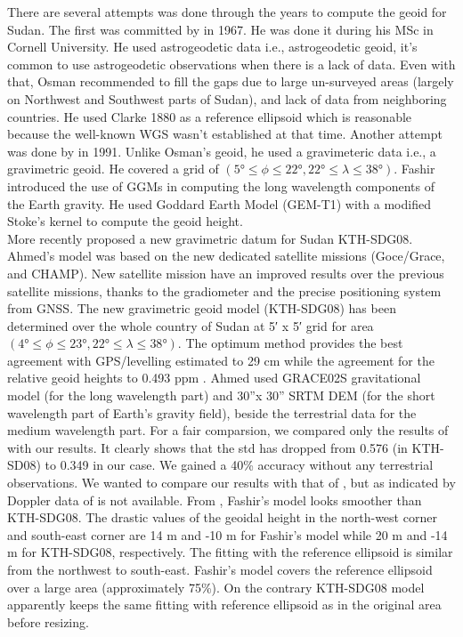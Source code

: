 There are several attempts was done through the years to compute the geoid for Sudan. The first was committed by \cite{osman} in 1967. He was done it during his MSc in Cornell University. He used astrogeodetic data i.e., astrogeodetic geoid, it's common to use astrogeodetic observations when there is a lack of data. Even with that, Osman recommended to fill the gaps due to large un-surveyed areas (largely on Northwest and Southwest parts of Sudan), and lack of data from neighboring countries. He used Clarke 1880 as a reference ellipsoid which is reasonable because the well-known WGS wasn't established at that time. Another attempt was done by \cite{fashir} in 1991. Unlike Osman's geoid, he used a gravimeteric data i.e., a gravimetric geoid. He covered a grid of $(5 \si{\degree} \le \phi \le 22 \si{\degree} , 22 \si{\degree} \le \lambda \le 38\si{\degree})$. Fashir introduced the use of GGMs in computing the long wavelength components of the Earth gravity. He used Goddard Earth Model (GEM-T1) with a modified Stoke's kernel to compute the geoid height.\\
More recently \cite{ahmed_msc} proposed a new gravimetric datum for Sudan KTH-SDG08. Ahmed's model was based on the new dedicated satellite missions (Goce/Grace, and CHAMP). New satellite mission have an improved results over the previous satellite missions, thanks to the gradiometer and the precise positioning system from GNSS. The new gravimetric geoid model (KTH-SDG08) has been determined over the whole country of Sudan at 5′ x 5′ grid for area $(4 \si{\degree} \le \phi \le 23 \si{\degree}, 22 \si{\degree} \le \lambda \le 38 \si{\degree})$. The optimum method provides the best agreement with GPS/levelling estimated to 29 cm while the agreement for the relative geoid heights to 0.493 ppm \cite{ahmed_msc}. Ahmed used GRACE02S gravitational model (for the long wavelength part) and 30”x 30” SRTM DEM (for the short wavelength part of Earth's gravity field), beside the terrestrial data for the medium wavelength part. For a fair comparsion, we compared only the results of \cite{ahmed_msc} with our results. It clearly shows that the std has dropped from 0.576 (in KTH-SD08) to 0.349 in our case. We gained a 40\% accuracy without any terrestrial observations.
We wanted to compare our results with that of \cite{fashir}, but as indicated by \cite{ahmed_msc} Doppler data of \cite{fashir} is not available. From \cite{ahmed_msc}, Fashir’s model looks smoother than KTH-SDG08. The drastic values of the geoidal height in the north-west corner and south-east corner are 14 m and -10 m for Fashir’s model while 20 m and -14 m for KTH-SDG08, respectively. The fitting with the reference ellipsoid is similar from the northwest to south-east. Fashir’s model covers the reference ellipsoid over a large area
(approximately 75\%). On the contrary KTH-SDG08 model apparently keeps the same fitting
with reference ellipsoid as in the original area before resizing.


